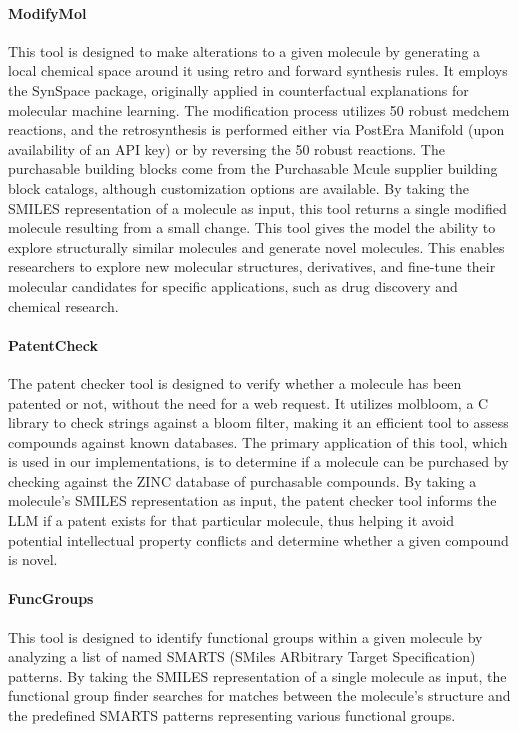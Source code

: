 \documentclass[10pt]{article}
\begin{document}
\paragraph{ModifyMol}
This tool is designed to make alterations to a given molecule by generating a local chemical space around it using retro and forward synthesis rules. It employs the SynSpace package\cite{synspace}, originally applied in counterfactual explanations for molecular machine learning\cite{wellawatte2022model}. The modification process utilizes 50 robust medchem reactions\cite{medchem}, and the retrosynthesis is performed either via PostEra Manifold\cite{yang2019molecular, schwaller2019molecular} (upon availability of an API key) or by reversing the 50 robust reactions. The purchasable building blocks come from the Purchasable Mcule supplier building block catalogs\cite{mcule}, although customization options are available. By taking the SMILES representation of a molecule as input, this tool returns a single modified molecule resulting from a small change. This tool gives the model the ability to explore structurally similar molecules and generate novel molecules. This enables researchers to explore new molecular structures, derivatives, and fine-tune their molecular candidates for specific applications, such as drug discovery and chemical research.

\paragraph{PatentCheck}
The patent checker tool is designed to verify whether a molecule has been patented or not, without the need for a web request. It utilizes molbloom\cite{medina2023bloom}, a C library to check strings against a bloom filter, making it an efficient tool to assess compounds against known databases. The primary application of this tool, which is used in our implementations, is to determine if a molecule can be purchased by checking against the ZINC database of purchasable compounds. By taking a molecule's SMILES representation as input, the patent checker tool informs the LLM if a patent exists for that particular molecule, thus helping it avoid potential intellectual property conflicts and determine whether a given compound is novel.

\paragraph{FuncGroups}
This tool is designed to identify functional groups within a given molecule by analyzing a list of named SMARTS (SMiles ARbitrary Target Specification) patterns. By taking the SMILES representation of a single molecule as input, the functional group finder searches for matches between the molecule's structure and the predefined SMARTS patterns representing various functional groups.
\end{document}
